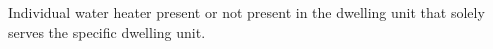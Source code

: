 Individual water heater present or not present in the dwelling unit that solely serves the specific dwelling unit.
